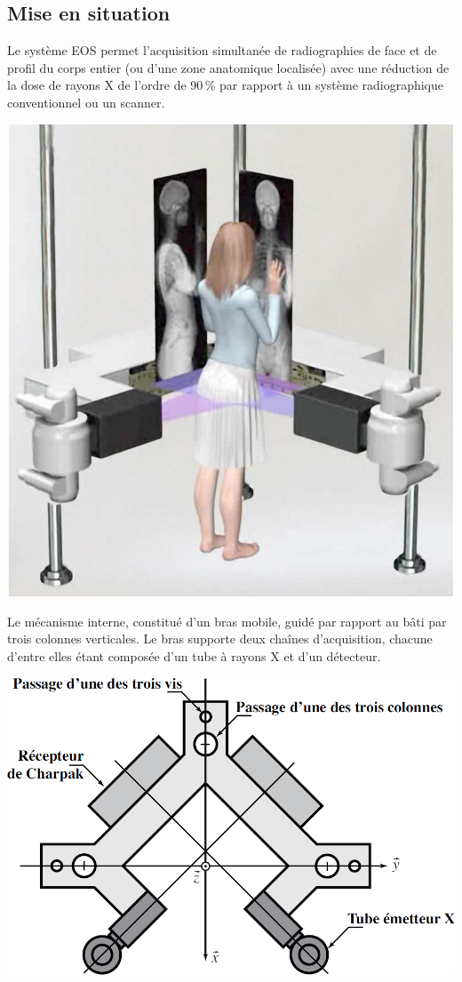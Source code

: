 \documentclass[10pt,fleqn]{article} %
\begin{document}

\vspace{5cm}
\pagestyle{fancy}
\thispagestyle{plain}


\def\columnseprulecolor{\color{ocre}}
\setlength{\columnseprule}{0.4pt} 

\ifprof
\else
\begin{multicols}{2}
\fi

\subsection*{Mise en situation}
\ifprof
\else
Le système EOS permet l’acquisition simultanée de radiographies de face et de profil du corps entier (ou d’une zone anatomique localisée) avec une réduction de la dose de rayons X de l’ordre de 90\,\% par rapport à un système radiographique conventionnel ou un scanner.


\begin{center}
\includegraphics[width=.7\linewidth]{images/fig_02}
\end{center}

Le mécanisme interne, constitué d’un bras mobile, guidé par rapport au bâti par trois colonnes
verticales. Le bras supporte deux chaînes d’acquisition, chacune d’entre elles étant composée d’un tube à rayons X et d’un détecteur.

\begin{center}
\includegraphics[width=.7\linewidth]{images/fig_03}
\end{center}



\end{multicols}
\end{document}
